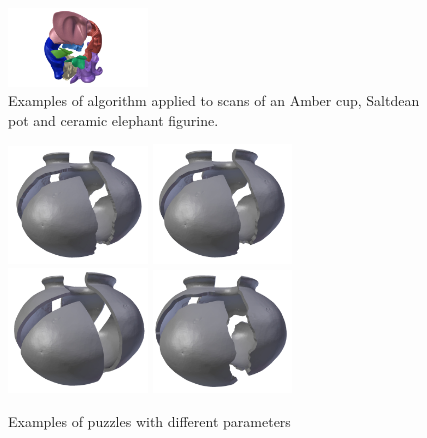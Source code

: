 \documentclass[acmlarge,screen,dvipsnames]{acmart}
\begin{document}
\begin{figure}[h]
  \includegraphics[width=0.33\textwidth]{images/elephantpuzzle4}
  \caption{Examples of algorithm applied to scans of an Amber cup, Saltdean pot and
    ceramic elephant figurine.}
\end{figure}

\begin{figure}[h]    
     \centering
         {\includegraphics[width=0.33\textwidth]{images/all11.jpg}}
        {\includegraphics[width=0.33\textwidth]{images/all22.jpg}}
        {\includegraphics[width=0.33\textwidth]{images/all33.jpg}}
        {\includegraphics[width=0.33\textwidth]{images/all44.jpg}}
      \caption{Examples of puzzles with different parameters}\label{allsettings}
\end{figure}
\end{document}
